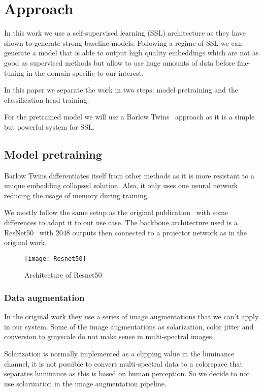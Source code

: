 \documentclass[conference]{IEEEtran}
\begin{document}
    \section{Approach}
    In this work we use a self-supervised learning (SSL) architecture as they have shown to generate strong baseline models.
    Following a regime of SSL we can generate a model that is able to output high quality embeddings which are not
    as good as supervised methods but allow to use huge amounts of data before fine-tuning in the domain specific to our interest.

    In this paper we separate the work in two steps: model pretraining and the classification head training.

    For the pretrained model we will use a Barlow Twins~\cite{barlowtwins} approach as it is a simple but powerful system for
    SSL.

    \subsection{Model pretraining}
    Barlow Twins differentiates itself from other methods as it is more resistant to a unique embedding collapsed solution.
    Also, it only uses one neural network reducing the usage of memory during training.

    We mostly follow the same setup as the original publication~\cite{barlowtwins} with some differences to adapt it to out use case.
    The backbone architecture used is a ResNet50~\cite{he2015deep} with 2048 outputs then connected to a projector network as in the original work.

    \begin{figure}
        \centering
        \texttt{[image: Resnet50]}
        \caption{Architecture of Resnet50}
        \label{fig:resnet50}
    \end{figure}

    \subsubsection{Data augmentation}
    In the original work they use a series of image augmentations that we can't apply in our system.
    Some of the image augmentations as solarization, color jitter and conversion to grayscale do not make sense in multi-spectral images.

    Solarization is normally implemented as a clipping value in the luminance channel, it is not possible to convert multi-spectral data to
    a colorspace that separates luminance as this is based on human perception.
    So we decide to not use solarization in the image augmentation pipeline.
\end{document}
